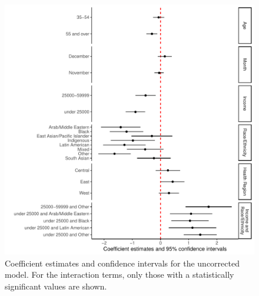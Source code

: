 \documentclass[
  letterpaper,
  DIV=11,
  numbers=noendperiod]{scrartcl}
\begin{document}
\begin{figure}

\includegraphics{main_files/figure-pdf/fig-model-uncorr-1.pdf} \hfill{}

\caption{\label{fig-model-uncorr}Coefficient estimates and confidence
intervals for the uncorrected model. For the interaction terms, only
those with a statistically significant values are shown.}

\end{figure}
\end{document}

